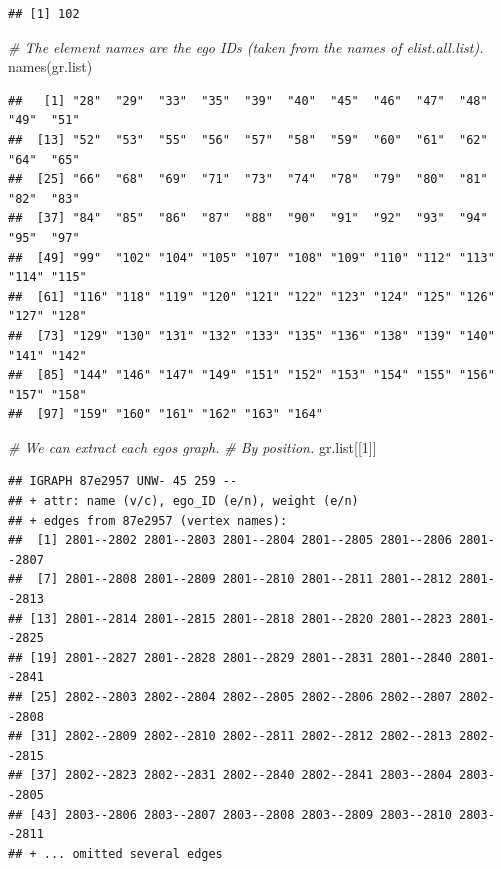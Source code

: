 \documentclass[
]{book}
\newenvironment{Shaded}{\begin{snugshade}}{\end{snugshade}}
\newcommand{\CommentTok}[1]{\textcolor[rgb]{0.56,0.35,0.01}{\textit{#1}}}
\newcommand{\DecValTok}[1]{\textcolor[rgb]{0.00,0.00,0.81}{#1}}
\newcommand{\FunctionTok}[1]{\textcolor[rgb]{0.00,0.00,0.00}{#1}}
\newcommand{\NormalTok}[1]{#1}
\begin{document}
\begin{verbatim}
## [1] 102
\end{verbatim}

\begin{Shaded}
\begin{Highlighting}[]
\CommentTok{\# The element names are the ego IDs (taken from the names of elist.all.list).}
\FunctionTok{names}\NormalTok{(gr.list)}
\end{Highlighting}
\end{Shaded}

\begin{verbatim}
##   [1] "28"  "29"  "33"  "35"  "39"  "40"  "45"  "46"  "47"  "48"  "49"  "51" 
##  [13] "52"  "53"  "55"  "56"  "57"  "58"  "59"  "60"  "61"  "62"  "64"  "65" 
##  [25] "66"  "68"  "69"  "71"  "73"  "74"  "78"  "79"  "80"  "81"  "82"  "83" 
##  [37] "84"  "85"  "86"  "87"  "88"  "90"  "91"  "92"  "93"  "94"  "95"  "97" 
##  [49] "99"  "102" "104" "105" "107" "108" "109" "110" "112" "113" "114" "115"
##  [61] "116" "118" "119" "120" "121" "122" "123" "124" "125" "126" "127" "128"
##  [73] "129" "130" "131" "132" "133" "135" "136" "138" "139" "140" "141" "142"
##  [85] "144" "146" "147" "149" "151" "152" "153" "154" "155" "156" "157" "158"
##  [97] "159" "160" "161" "162" "163" "164"
\end{verbatim}

\begin{Shaded}
\begin{Highlighting}[]
\CommentTok{\# We can extract each ego\textquotesingle{}s graph.}
\CommentTok{\# By position.}
\NormalTok{gr.list[[}\DecValTok{1}\NormalTok{]]}
\end{Highlighting}
\end{Shaded}

\begin{verbatim}
## IGRAPH 87e2957 UNW- 45 259 -- 
## + attr: name (v/c), ego_ID (e/n), weight (e/n)
## + edges from 87e2957 (vertex names):
##  [1] 2801--2802 2801--2803 2801--2804 2801--2805 2801--2806 2801--2807
##  [7] 2801--2808 2801--2809 2801--2810 2801--2811 2801--2812 2801--2813
## [13] 2801--2814 2801--2815 2801--2818 2801--2820 2801--2823 2801--2825
## [19] 2801--2827 2801--2828 2801--2829 2801--2831 2801--2840 2801--2841
## [25] 2802--2803 2802--2804 2802--2805 2802--2806 2802--2807 2802--2808
## [31] 2802--2809 2802--2810 2802--2811 2802--2812 2802--2813 2802--2815
## [37] 2802--2823 2802--2831 2802--2840 2802--2841 2803--2804 2803--2805
## [43] 2803--2806 2803--2807 2803--2808 2803--2809 2803--2810 2803--2811
## + ... omitted several edges
\end{verbatim}
\end{document}
